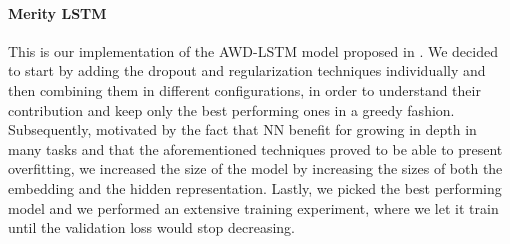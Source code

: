 \paragraph*{Merity LSTM}
This is our implementation of the AWD-LSTM model proposed in \cite{merity2017regularizing}. We decided to start by adding the dropout and regularization techniques individually and then combining them in different configurations, in order to understand their contribution and keep only the best performing ones in a greedy fashion. Subsequently, motivated by the fact that NN benefit for growing in depth in many tasks and that the aforementioned techniques proved to be able to present overfitting, we increased the size of the model by increasing the sizes of both the embedding and the hidden representation. Lastly, we picked the best performing model and we performed an extensive training experiment, where we let it train until the validation loss would stop decreasing.